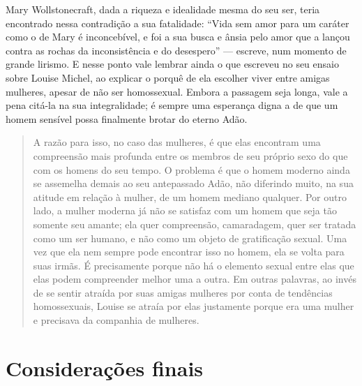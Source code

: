 Mary Wollstonecraft, dada
a riqueza e idealidade mesma do seu ser, teria encontrado nessa
contradição a sua fatalidade: ``Vida sem amor para um caráter como o de
Mary é inconcebível, e foi a sua busca e ânsia pelo amor que a lançou
contra as rochas da inconsistência e do desespero'' --- escreve, num
momento de grande lirismo. E nesse ponto vale lembrar ainda o que
escreveu no seu ensaio sobre Louise Michel, ao explicar o porquê de ela
escolher viver entre amigas mulheres, apesar de não ser homossexual.
Embora a passagem seja longa, vale a pena citá-la na sua integralidade;
é sempre uma esperança digna a de que um homem sensível possa finalmente
brotar do eterno Adão.

\begin{quote}
A razão para isso, no caso das mulheres, é que elas encontram uma
compreensão mais profunda entre os membros de seu próprio sexo do que
com os homens do seu tempo. O problema é que o homem moderno ainda se
assemelha demais ao seu antepassado Adão, não diferindo muito, na sua
atitude em relação à mulher, de um homem mediano qualquer. Por outro
lado, a mulher moderna já não se satisfaz com um homem que seja tão
somente seu amante; ela quer compreensão, camaradagem, quer ser tratada
como um ser humano, e não como um objeto de gratificação sexual. Uma vez
que ela nem sempre pode encontrar isso no homem, ela se volta para suas
irmãs. É precisamente porque não há o elemento sexual entre elas que
elas podem compreender melhor uma a outra. Em outras palavras, ao invés
de se sentir atraída por suas amigas mulheres por conta de tendências
homossexuais, Louise se atraía por elas justamente porque era uma mulher
e precisava da companhia de mulheres.
\end{quote}

\section{Considerações finais}

